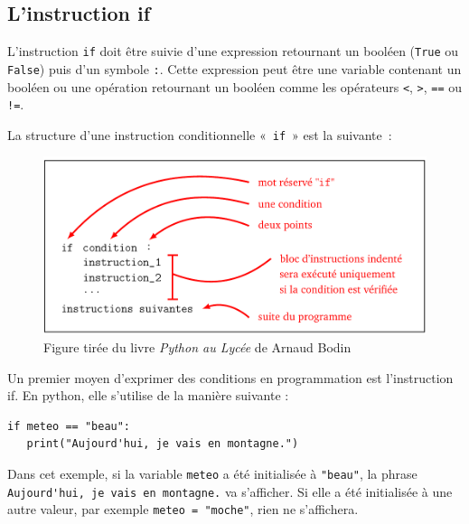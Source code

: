 \subsection{L'instruction \textsf{if}}
\begin{mydefinition}
	L'instruction \lstinline{if} doit être suivie d'une expression retournant un booléen (\lstinline{True} ou \lstinline{False}) puis d'un symbole \lstinline{:}.  Cette expression peut être une variable contenant un booléen ou une opération retournant un booléen comme les opérateurs \lstinline{<}, \lstinline{>}, \lstinline{==} ou \lstinline{!=}.
\end{mydefinition}

La structure d’une instruction conditionnelle « \lstinline{if} » est la suivante :


\begin{figure}[h!]
	\centering
	\includegraphics[width=0.7\linewidth]{Images/test/if_structure}
	\caption{Figure tirée du livre \textit{Python au Lycée} de Arnaud Bodin}
\end{figure}


\begin{myexample}
	Un premier moyen d'exprimer des conditions en programmation est l'instruction \textsf{if}. En python, elle s'utilise de la manière suivante : 
	
	\begin{lstlisting}[numbers=none]
if meteo == "beau":
   print("Aujourd'hui, je vais en montagne.")
	\end{lstlisting}
	
	Dans cet exemple, si la variable \lstinline{meteo} a été initialisée à \lstinline{"beau"}, la phrase \lstinline{Aujourd'hui, je vais en montagne.} va s'afficher. Si elle a été initialisée à une autre valeur, par exemple \lstinline{meteo = "moche"}, rien ne s'affichera.
\end{myexample}


